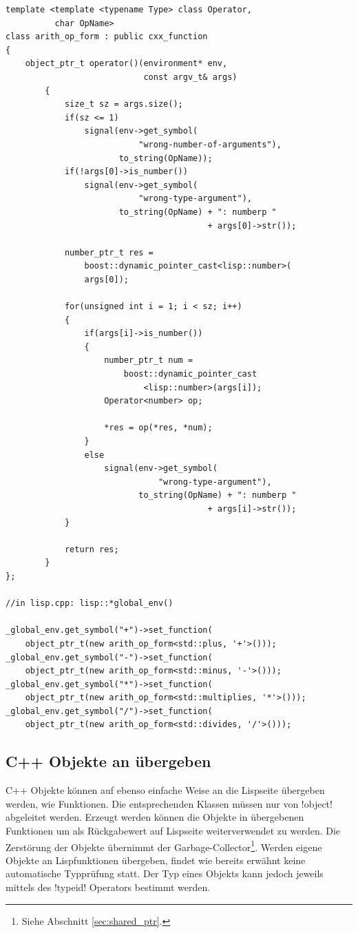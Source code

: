 \begin{lstlisting}[caption={Arithmetische Operatoren an Lisp übergeben}, label=lst:cxx_function]
template <template <typename Type> class Operator,
          char OpName>
class arith_op_form : public cxx_function
{
    object_ptr_t operator()(environment* env,
                            const argv_t& args)
        {
            size_t sz = args.size();
            if(sz <= 1)
                signal(env->get_symbol(
                           "wrong-number-of-arguments"),
                       to_string(OpName));
            if(!args[0]->is_number())
                signal(env->get_symbol(
                           "wrong-type-argument"),
                       to_string(OpName) + ": numberp "
                                         + args[0]->str());

            number_ptr_t res = 
                boost::dynamic_pointer_cast<lisp::number>(
                args[0]);

            for(unsigned int i = 1; i < sz; i++)
            {
                if(args[i]->is_number())
                {
                    number_ptr_t num =
                        boost::dynamic_pointer_cast
                            <lisp::number>(args[i]);
                    Operator<number> op;

                    *res = op(*res, *num);
                }
                else
                    signal(env->get_symbol(
                               "wrong-type-argument"),
                           to_string(OpName) + ": numberp "
                                         + args[i]->str());
            }

            return res;
        }
};

//in lisp.cpp: lisp::*global_env()

_global_env.get_symbol("+")->set_function(
    object_ptr_t(new arith_op_form<std::plus, '+'>()));
_global_env.get_symbol("-")->set_function(
    object_ptr_t(new arith_op_form<std::minus, '-'>()));
_global_env.get_symbol("*")->set_function(
    object_ptr_t(new arith_op_form<std::multiplies, '*'>()));
_global_env.get_symbol("/")->set_function(
    object_ptr_t(new arith_op_form<std::divides, '/'>()));
\end{lstlisting}

\subsection{C++ Objekte an \projectname{} übergeben}
\label{sec:cxx_object_interface}

C++ Objekte können auf ebenso einfache Weise an die Lispseite übergeben werden, wie Funktionen. Die entsprechenden Klassen müssen nur von !object! abgeleitet werden. Erzeugt werden können die Objekte in übergebenen Funktionen um als Rückgabewert auf Lispseite weiterverwendet zu werden. Die Zerstörung der Objekte übernimmt der Garbage-Collector\footnote{Siehe Abschnitt \ref{sec:shared_ptr}.}. Werden eigene Objekte an Lispfunktionen übergeben, findet wie bereits erwähnt keine automatische Typprüfung statt. Der Typ eines Objekts kann jedoch jeweils mittels des !typeid! Operators bestimmt werden.
